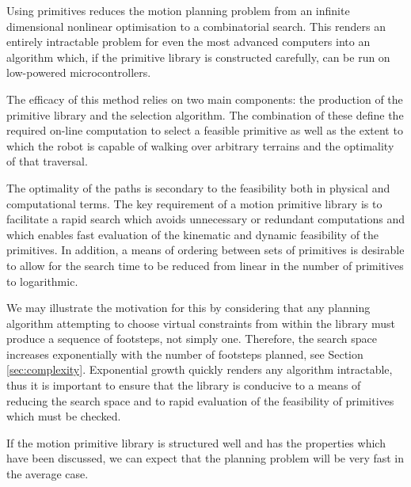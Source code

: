 Using primitives reduces the motion planning problem from an infinite dimensional nonlinear optimisation to a combinatorial search. This renders an entirely intractable problem for even the most advanced computers into an algorithm which, if the primitive library is constructed carefully, can be run on low-powered microcontrollers.

The efficacy of this method relies on two main components: the production of the primitive library and the selection algorithm. The combination of these define the required on-line computation to select a feasible primitive as well as the extent to which the robot is capable of walking over arbitrary terrains and the optimality of that traversal.

The optimality of the paths is secondary to the feasibility both in physical and computational terms. The key requirement of a motion primitive library is to facilitate a rapid search which avoids unnecessary or redundant computations and which enables fast evaluation of the kinematic and dynamic feasibility of the primitives. In addition, a means of ordering between sets of primitives is desirable to allow for the search time to be reduced from linear in the number of primitives to logarithmic.

We may illustrate the motivation for this by considering that any planning algorithm attempting to choose virtual constraints from within the library must produce a sequence of footsteps, not simply one. Therefore, the search space increases exponentially with the number of footsteps planned, see Section \ref{sec:complexity}. Exponential growth quickly renders any algorithm intractable, thus it is important to ensure that the library is conducive to a means of reducing the search space and to rapid evaluation of the feasibility of primitives which must be checked.

If the motion primitive library is structured well and has the properties which have been discussed, we can expect that the planning problem will be very fast in the average case.